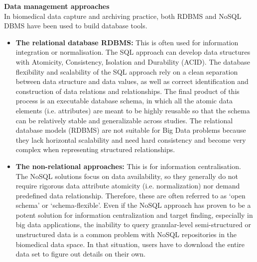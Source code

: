\documentclass[10pt,a4paper,twoside]{article}
\begin{document}
\textbf{Data management approaches }\\
In biomedical data capture and archiving practice, both RDBMS and NoSQL DBMS have been used to build database tools. 
\begin{itemize}
 \item \textbf{The relational database RDBMS:} This is often used for information integration or normalisation. The SQL approach can develop data structures with Atomicity, Consistency, Isolation and Durability (ACID). The database flexibility and scalability of the SQL approach rely on a clean separation between data structure and data values, as well as correct identification and construction of data relations and relationships. The final product of this process is an executable database schema, in which all the atomic data elements (i.e. attributes) are meant to be highly reusable so that the schema can be relatively stable and generalizable across studies. The relational database models (RDBMS) are not suitable for Big Data problems because they lack horizontal scalability and need hard consistency and become very complex when representing structured relationships.

 \item \textbf{The non-relational approaches: }This is for information centralisation. The NoSQL solutions focus on data availability, so they generally do not require rigorous data attribute atomicity (i.e. normalization) nor demand predefined data relationship. Therefore, these are often referred to as ‘open schema’ or ‘schema-flexible’. Even if the NoSQL approach has proven to be a potent solution for information centralization and target finding, especially in big data applications, the inability to query granular-level semi-structured or unstructured data is a common problem with NoSQL repositories in the biomedical data space. In that situation, users have to download the entire data set to figure out details on their own.
 
\end{itemize}
\end{document}
